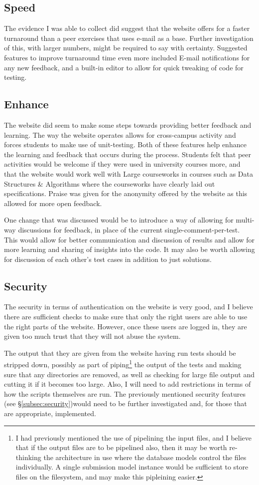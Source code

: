 \documentclass[a4paper,11pt]{report}
\begin{document}
\subsection{Speed}
The evidence I was able to collect did suggest that the website offers for a faster turnaround than a peer exercises that uses e-mail as a base. Further investigation of this, with larger numbers, might be required to say with certainty. Suggested features to improve turnaround time even more included E-mail notifications for any new feedback, and a built-in editor to allow for quick tweaking of code for testing.
\subsection{Enhance}
The website did seem to make some steps towards providing better feedback and learning. The way the website operates allows for cross-campus activity and forces students to make use of unit-testing. Both of these features help enhance the learning and feedback that occurs during the process. Students felt that peer activities would be welcome if they were used in university courses more, and that the website would work well with Large courseworks in courses such as Data Structures \& Algorithms where the courseworks have clearly laid out specifications. Praise was given for the anonymity offered by the website as this allowed for more open feedback.\par
One change that was discussed would be to introduce a way of allowing for multi-way discussions for feedback, in place of the current single-comment-per-test. This would allow for better communication and discussion of results and allow for more learning and sharing of insights into the code. It may also be worth allowing for discussion of each other's test cases in addition to just solutions.
\subsection{Security}
The security in terms of authentication on the website is very good, and I believe there are sufficient checks to make sure that only the right users are able to use the right parts of the website. However, once these users are logged in, they are given too much trust that they will not abuse the system.\par
The output that they are given from the website having run tests should be stripped down, possibly as part of piping\footnote{I had previously mentioned the use of pipelining the input files, and I believe that if the output files are to be pipelined also, then it may be worth re-thinking the architecture in use where the database models control the files individually. A single submission model instance would be sufficient to store files on the filesystem, and may make this pipleining easier.} the output of the tests and making sure that any directories are removed, as well as checking for large file output and cutting it if it becomes too large.
Also, I will need to add restrictions in terms of how the scripts themselves are run. The previously mentioned security features (see \S\ref{subsec:security})would need to be further investigated and, for those that are appropriate, implemented.
\end{document}
